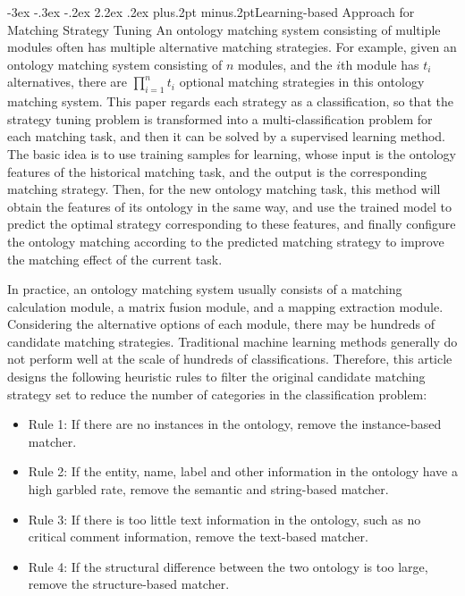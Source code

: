 \documentclass[twoside]{article}
\makeatletter
\def\section{\@startsection{section}{1}{\z@}%
 {-3ex \@plus -.3ex \@minus -.2ex}%
 {2.2ex \@plus.2ex}%
{\normalfont\normalsize\protect\baselineskip=14.5pt plus.2pt minus.2pt\bfseries}}
\def\subsection{\@startsection{subsection}{2}{\z@}%
 {-3ex\@plus -.2ex \@minus -.2ex}%
 {2ex \@plus.2ex}%
{\normalfont\normalsize\protect\baselineskip=12.5pt plus.2pt minus.2pt\bfseries}}
\makeatother
\begin{document}
\begin{multicols}{2}
\section{Learning-based Approach for Matching Strategy Tuning}
An ontology matching system consisting of multiple modules often has multiple alternative matching strategies. 
For example, given an ontology matching system consisting of $ n $ modules, and the $ i $th module has $ t_i $ alternatives, there are $\prod_{i=1}^{n}t_i $ optional matching strategies in this ontology matching system.
This paper regards each strategy as a classification, so that the strategy tuning problem is transformed into a multi-classification problem for each matching task, and then it can be solved by a supervised learning method.
The basic idea is to use training samples for learning, whose input is the ontology features of the historical matching task, and the output is the corresponding matching strategy.
Then, for the new ontology matching task, this method will obtain the features of its ontology in the same way, and use the trained model to predict the optimal strategy corresponding to these features, and finally configure the ontology matching according to the predicted matching strategy to improve the matching effect of the current task.

In practice, an ontology matching system usually consists of a matching calculation module, a matrix fusion module, and a mapping extraction module. 
Considering the alternative options of each module, there may be hundreds of candidate matching strategies. 
Traditional machine learning methods generally do not perform well at the scale of hundreds of classifications. 
Therefore, this article designs the following heuristic rules to filter the original candidate matching strategy set to reduce the number of categories in the classification problem:
\begin{itemize}
\item Rule 1: If there are no instances in the ontology, remove the instance-based matcher.
\item Rule 2: If the entity, name, label and other information in the ontology have a high garbled rate, remove the semantic and string-based matcher.
\item Rule 3: If there is too little text information in the ontology, such as no critical comment information, remove the text-based matcher.
\item Rule 4: If the structural difference between the two ontology is too large, remove the structure-based matcher.
\end{itemize}


\end{multicols}
\end{document}
